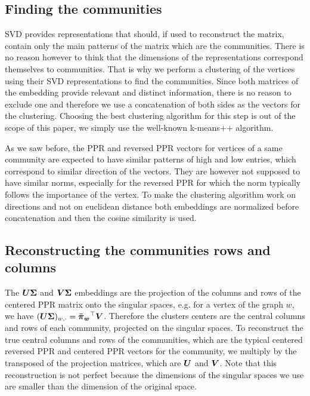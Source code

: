 \subsection{Finding the communities}
SVD provides representations that should, if used to reconstruct the matrix, contain only the main patterns of the matrix which are the communities. There is no reason however to think that the dimensions of the representations correspond themselves to communities. That is why we perform a clustering of the vertices using their SVD representations to find the communities. Since both matrices of the embedding provide relevant and distinct information, there is no reason to exclude one and therefore we use a concatenation of both sides as the vectors for the clustering. 
Choosing the best clustering algorithm for this step is out of the scope of this paper, we simply use the well-known k-means++ algorithm.%

As we saw before, the PPR and reversed PPR vectors for vertices of a same community are expected to have similar patterns of high and low entries, which correspond to similar direction of the vectors. They are however not supposed to have similar norms, especially for the reversed PPR for which the norm typically follows the importance of the vertex. To make the clustering algorithm work on directions and not on euclidean distance both embeddings are normalized before concatenation and then the cosine similarity is used.

\subsection{Reconstructing the communities rows and columns}
The $\boldsymbol{U}\boldsymbol{\Sigma}$ and $\boldsymbol{V}\boldsymbol{\Sigma}$ embeddings are the projection of the columns and rows of the centered PPR matrix onto the singular spaces, e.g. for a vertex of the graph $w$, we have $ (\boldsymbol{U}\boldsymbol{\Sigma})_{w, \cdot} = \boldsymbol{\Bar{\pi}_w}^\top\boldsymbol{V}$. Therefore the clusters centers are the central columns and rows of each community, projected on the singular spaces. To reconstruct the true central columns and rows of the communities, which are the typical centered reversed PPR and centered PPR vectors for the community, we multiply by the transposed of the projection matrices, which are $\boldsymbol{U}$ and $\boldsymbol{V}$. Note that this reconstruction is not perfect because the dimensions of the singular spaces we use are smaller than the dimension of the original space.


